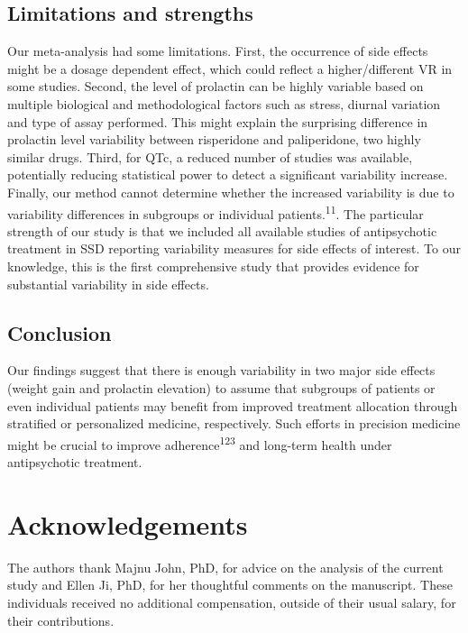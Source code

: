 \documentclass[9pt,english,,jou,floatsintext]{apa6}
\begin{document}
\subsection{Limitations and strengths}\label{limitations-and-strengths}

Our meta-analysis had some limitations. First, the occurrence of side
effects might be a dosage dependent effect, which could reflect a
higher/different VR in some studies. Second, the level of prolactin can
be highly variable based on multiple biological and methodological
factors such as stress, diurnal variation and type of assay performed.
This might explain the surprising difference in prolactin level
variability between risperidone and paliperidone, two highly similar
drugs. Third, for QTc, a reduced number of studies was available,
potentially reducing statistical power to detect a significant
variability increase. Finally, our method cannot determine whether the
increased variability is due to variability differences in subgroups or
individual patients.\textsuperscript{11}. The particular strength of our
study is that we included all available studies of antipsychotic
treatment in SSD reporting variability measures for side effects of
interest. To our knowledge, this is the first comprehensive study that
provides evidence for substantial variability in side effects.

\subsection{Conclusion}\label{conclusion}

Our findings suggest that there is enough variability in two major side
effects (weight gain and prolactin elevation) to assume that subgroups
of patients or even individual patients may benefit from improved
treatment allocation through stratified or personalized medicine,
respectively. Such efforts in precision medicine might be crucial to
improve adherence\textsuperscript{123} and long-term health under
antipsychotic treatment.

\section{Acknowledgements}\label{acknowledgements}

The authors thank Majnu John, PhD, for advice on the analysis of the
current study and Ellen Ji, PhD, for her thoughtful comments on the
manuscript. These individuals received no additional compensation,
outside of their usual salary, for their contributions.
\end{document}

